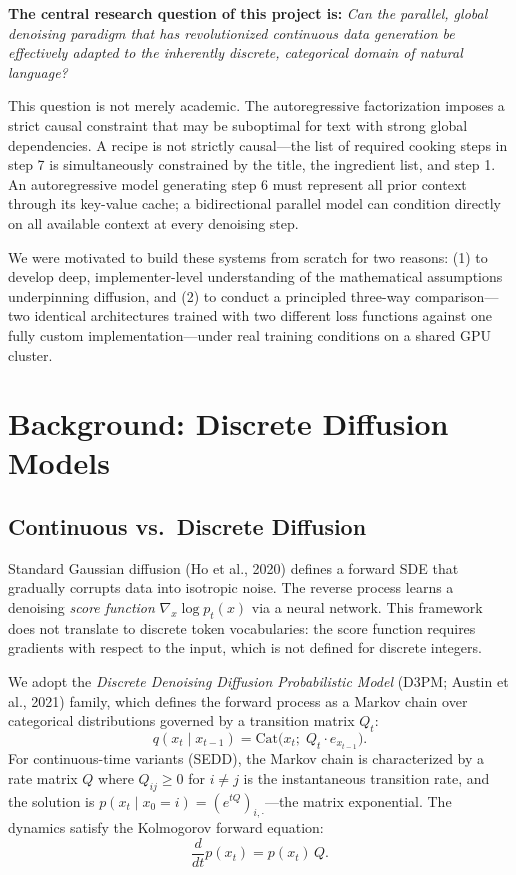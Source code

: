 \documentclass[11pt,a4paper]{article}
\begin{document}
\textbf{The central research question of this project is:} \emph{Can the parallel, global denoising paradigm that has revolutionized continuous data generation be effectively adapted to the inherently discrete, categorical domain of natural language?}

This question is not merely academic. The autoregressive factorization imposes a strict causal constraint that may be suboptimal for text with strong global dependencies. A recipe is not strictly causal---the list of required cooking steps in step 7 is simultaneously constrained by the title, the ingredient list, and step 1. An autoregressive model generating step 6 must represent all prior context through its key-value cache; a bidirectional parallel model can condition directly on all available context at every denoising step.

We were motivated to build these systems from scratch for two reasons: (1) to develop deep, implementer-level understanding of the mathematical assumptions underpinning diffusion, and (2) to conduct a principled three-way comparison---two identical architectures trained with two different loss functions against one fully custom implementation---under real training conditions on a shared GPU cluster.

\section{Background: Discrete Diffusion Models}

\subsection{Continuous vs.\ Discrete Diffusion}

Standard Gaussian diffusion (Ho et al., 2020) defines a forward SDE that gradually corrupts data into isotropic noise. The reverse process learns a denoising \emph{score function} $\nabla_x \log p_t(x)$ via a neural network. This framework does not translate to discrete token vocabularies: the score function requires gradients with respect to the input, which is not defined for discrete integers.

We adopt the \emph{Discrete Denoising Diffusion Probabilistic Model} (D3PM; Austin et al., 2021) family, which defines the forward process as a Markov chain over categorical distributions governed by a transition matrix $Q_t$:
\[
  q(x_t \mid x_{t-1}) = \mathrm{Cat}\!\bigl(x_t;\; Q_t \cdot e_{x_{t-1}}\bigr).
\]
For continuous-time variants (SEDD), the Markov chain is characterized by a rate matrix $Q$ where $Q_{ij} \geq 0$ for $i \neq j$ is the instantaneous transition rate, and the solution is $p(x_t \mid x_0 = i) = (e^{tQ})_{i,\cdot}$---the matrix exponential. The dynamics satisfy the Kolmogorov forward equation:
\[
  \frac{d}{dt} p(x_t) = p(x_t)\, Q.
\]
\end{document}
